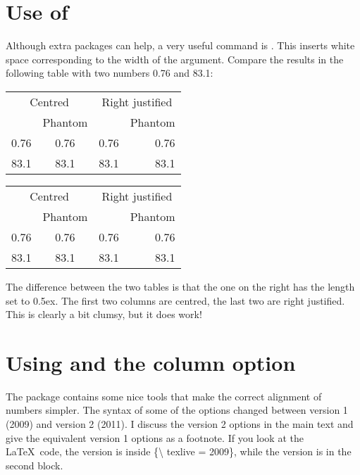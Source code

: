 \section{Use of }
\label{sec:table:phantom}

Although extra packages can help, a very useful command is
. This inserts white space corresponding to the width
of the argument. Compare the results in the following table with two
numbers 0.76 and 83.1:

\begin{center}
\begin{tabular}{cc|rr}
  \multicolumn{2}{c|}{Centred} &
  \multicolumn{2}{c}{Right justified} \\
  & Phantom & & Phantom\\\hline
  0.76 & \phantom{0}0.76 & 0.76 & 0.76\\
  83.1 & 83.1\phantom{0} & 83.1 & 83.1\phantom{0}
\end{tabular}
\qquad
{\setlength{\extrarowheight}{0.5ex}
\begin{tabular}{cc|rr}
  \multicolumn{2}{c|}{Centred} &
  \multicolumn{2}{c}{Right justified} \\
  & Phantom & & Phantom\\\hline
  0.76 & \phantom{0}0.76 & 0.76 & 0.76\\
  83.1 & 83.1\phantom{0} & 83.1 & 83.1\phantom{0}
\end{tabular}
}
\end{center}
\par\noindent
The difference between the two tables is that the one on the right
has the length  set to 0.5ex.  The first two
columns are centred, the last two are right justified.  This is
clearly a bit clumsy, but it does work!


\section{Using  and the  column option}
\label{sec:table:siunitx}

The  package contains some nice tools that make the
correct alignment of numbers simpler. The syntax of some of the
options changed between version 1 (2009) and version 2 (2011). I
discuss the version 2 options in the main text and give the equivalent
version 1 options as a footnote. If you look at the \LaTeX\ code, the
 version is inside \{\textbackslash
texlive = 2009\}, while the  version is in the second
block.

